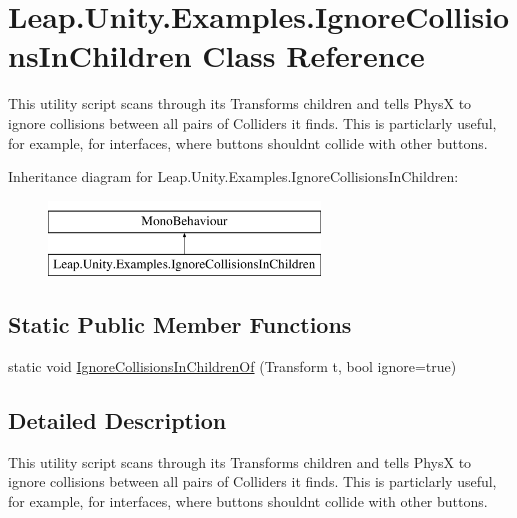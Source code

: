 \hypertarget{class_leap_1_1_unity_1_1_examples_1_1_ignore_collisions_in_children}{}\section{Leap.\+Unity.\+Examples.\+Ignore\+Collisions\+In\+Children Class Reference}
\label{class_leap_1_1_unity_1_1_examples_1_1_ignore_collisions_in_children}


This utility script scans through its Transform\textquotesingle{}s children and tells PhysX to ignore collisions between all pairs of Colliders it finds. This is particlarly useful, for example, for interfaces, where buttons shouldn\textquotesingle{}t collide with other buttons.  


Inheritance diagram for Leap.\+Unity.\+Examples.\+Ignore\+Collisions\+In\+Children\+:\begin{figure}[H]
\begin{center}
\leavevmode
\includegraphics[height=2.000000cm]{class_leap_1_1_unity_1_1_examples_1_1_ignore_collisions_in_children}
\end{center}
\end{figure}
\subsection*{Static Public Member Functions}
\begin{DoxyCompactItemize}
\item 
static void \mbox{\hyperlink{class_leap_1_1_unity_1_1_examples_1_1_ignore_collisions_in_children_a0b10c65bc5ec6cc178f4b0d914f8e4b5}{Ignore\+Collisions\+In\+Children\+Of}} (Transform t, bool ignore=true)
\end{DoxyCompactItemize}


\subsection{Detailed Description}
This utility script scans through its Transform\textquotesingle{}s children and tells PhysX to ignore collisions between all pairs of Colliders it finds. This is particlarly useful, for example, for interfaces, where buttons shouldn\textquotesingle{}t collide with other buttons. 


